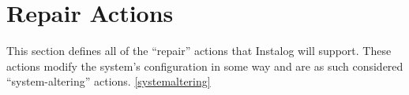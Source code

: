 \section{Repair Actions}
This section defines all of the ``repair'' actions that Instalog will support. 
These actions modify the system's configuration in some way and are as such
considered ``system-altering'' actions. \ref{systemaltering}
